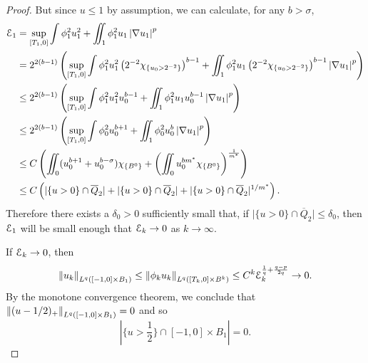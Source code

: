 \begin{proof}
But since $u \leq 1$ by assumption, we can calculate, for any $b > \sigma$,
\begin{align*} 
\mathcal{E}_1 &= \sup_{[T_1,0]} \int \phi_1^2 u_1^2 + \iint_1 \phi_1^2 u_1 \left\lvert \nabla u_1 \right\rvert^p
\\ &= 2^{2 (b-1)} \left(  \sup_{[T_1,0]} \int \phi_1^2 u_1^2 \left(  2^{-2} \chi_{\{u_0 > 2^{-2}\}}  \right)^{b-1} + \iint_1 \phi_1^2 u_1 \left(  2^{-2} \chi_{\{u_0 > 2^{-2}\}}  \right)^{b-1} \left\lvert \nabla u_1 \right\rvert^p  \right)
\\ &\leq 2^{2 (b-1)} \left(  \sup_{[T_1,0]} \int \phi_1^2 u_1^2 u_0^{b-1} + \iint_1 \phi_1^2 u_1 u_0^{b-1} \left\lvert \nabla u_1 \right\rvert^p  \right)
\\ &\leq 2^{2 (b-1)} \left(  \sup_{[T_1,0]} \int \phi_0^2 u_0^{b+1} + \iint_1 \phi_0^2 u_0^b \left\lvert \nabla u_1 \right\rvert^p  \right)
\\ &\leq C \left(  \iint_0 (u_0^{b+1} + u_0^{b-\sigma}) \chi_{\{B^0\}} + \left( \iint_0 u_0^{b m^\ast} \chi_{\{B^0\}} \right)^\frac{1}{m^\ast}  \right)
\\ &\leq C \left( |\{u>0\}\cap \overline{Q}_2| + |\{u>0\}\cap \overline{Q}_2| + |\{u>0\}\cap \overline{Q}_2|^{1/m^\ast} \right).
\end{align*}
Therefore there exists a $\delta_0>0$ sufficiently small that, if $\big|\{u > 0\} \cap \overline{Q}_2 \big| \leq \delta_0$, then $\mathcal{E}_1$ will be small enough that $\mathcal{E}_k \to 0$ as $k \to \infty$.  


If $\mathcal{E}_k \to 0$, then
\[ \left\lVert u_k\right\rVert_{L^q([-1,0]\times B_1)} \leq \left\lVert\phi_k u_k\right\rVert_{L^q([T_k,0]\times B^k)} \leq C^k \mathcal{E}_k^{\frac{1}{q} + \frac{q-p}{2q}} \to 0.\]  
By the monotone convergence theorem, we conclude that $\left\lVert(u-1/2)_+\right\rVert_{L^q([-1,0]\times B_1)} = 0$ and so
\[ |\{ u > \frac{1}{2} \} \cap [-1,0]\times B_1| = 0.\]  

\end{proof}





